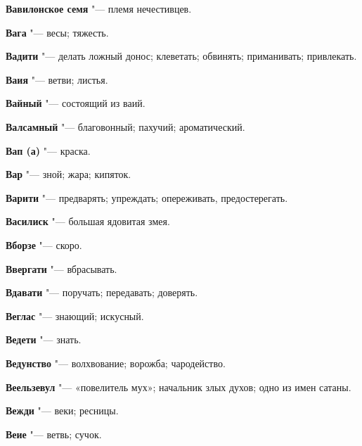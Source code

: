 \begin{mymulticols}{2}
\noindent\textbf{Вавилонское семя} "--- племя нечестивцев. 




\noindent\textbf{Вага} "--- весы; тяжесть. 




\noindent\textbf{Вадити} "--- делать ложный донос; клеветать; обвинять; приманивать; привлекать. 




\noindent\textbf{Ваия} "--- ветви; листья. 




\noindent\textbf{Вайный} "--- состоящий из ваий. 




\noindent\textbf{Валсамный} "--- благовонный; пахучий; ароматический. 




\noindent\textbf{Вап (а)} "--- краска. 




\noindent\textbf{Вар} "--- зной; жара; кипяток. 




\noindent\textbf{Варити} "--- предварять; упреждать; опереживать, предостерегать. 




\noindent\textbf{Василиск} "--- большая ядовитая змея. 




\noindent\textbf{Вборзе} "--- скоро. 




\noindent\textbf{Ввергати} "--- вбрасывать. 




\noindent\textbf{Вдавати} "--- поручать; передавать; доверять. 




\noindent\textbf{Веглас} "--- знающий; искусный. 




\noindent\textbf{Ведети} "--- знать. 




\noindent\textbf{Ведунство} "--- волхвование; ворожба; чародейство. 




\noindent\textbf{Веельзевул} "--- «повелитель мух»; начальник злых духов; одно из имен сатаны. 




\noindent\textbf{Вежди} "--- веки; ресницы. 




\noindent\textbf{Веие} "--- ветвь; сучок. 





\end{mymulticols}
